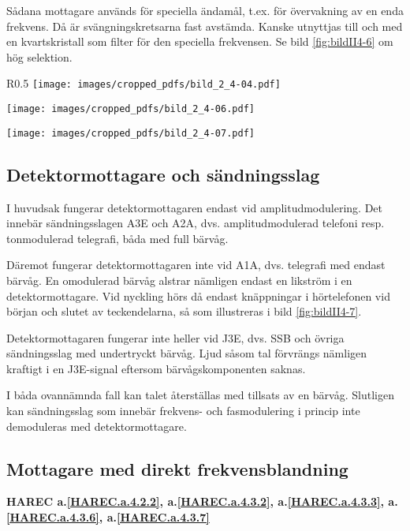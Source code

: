 Sådana mottagare används för speciella ändamål, t.ex. för övervakning
av en enda frekvens.
Då är svängningskretsarna fast avstämda.
Kanske utnyttjas till och med en kvartskristall som filter för den speciella
frekvensen.
Se bild \ref{fig:bildII4-6} om hög selektion.

\begin{wrapfigure}{R}{0.5\textwidth}
  \texttt{[image: images/cropped\_pdfs/bild\_2\_4-04.pdf]}
  \caption{Förbättrad selektion}
  \label{fig:bildII4-4}

  \texttt{[image: images/cropped\_pdfs/bild\_2\_4-06.pdf]}
  \caption{Hög HF-selektion}
  \label{fig:bildII4-6}

  \texttt{[image: images/cropped\_pdfs/bild\_2\_4-07.pdf]}
  \caption{CW i detektormottagare}
  \label{fig:bildII4-7}
\end{wrapfigure}

\subsection{Detektormottagare och sändningsslag}

I huvudsak fungerar detektormottagaren endast vid amplitudmodulering.
Det innebär sändningsslagen A3E och A2A, dvs. amplitudmodulerad telefoni
resp. tonmodulerad telegrafi, båda med full bärvåg.

Däremot fungerar detektormottagaren inte vid A1A, dvs. telegrafi med
endast bärvåg.
En omodulerad bärvåg alstrar nämligen endast en likström i en
detektormottagare.
Vid nyckling hörs då endast knäppningar i hörtelefonen vid början och
slutet av teckendelarna, så som illustreras i bild \ref{fig:bildII4-7}.

Detektormottagaren fungerar inte heller vid J3E, dvs. SSB och övriga
sändningsslag med undertryckt bärvåg.
Ljud såsom tal förvrängs nämligen kraftigt i en J3E-signal eftersom
bärvågskomponenten saknas.

I båda ovannämnda fall kan talet återställas med tillsats av en bärvåg.
Slutligen kan sändningsslag som innebär frekvens- och fasmodulering i
princip inte demoduleras med detektormottagare.

\subsection{Mottagare med direkt frekvensblandning}
\textbf{HAREC a.\ref{HAREC.a.4.2.2}\label{myHAREC.a.4.2.2},
a.\ref{HAREC.a.4.3.2}\label{myHAREC.a.4.3.2},
a.\ref{HAREC.a.4.3.3}\label{myHAREC.a.4.3.3},
a.\ref{HAREC.a.4.3.6}\label{myHAREC.a.4.3.6},
a.\ref{HAREC.a.4.3.7}\label{myHAREC.a.4.3.7}
}

